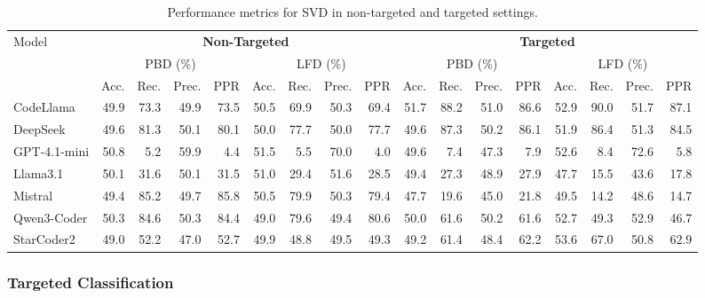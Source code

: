 \documentclass[lettersize,journal]{IEEEtran}
\begin{document}
\begin{table}[!t]
    \centering
    \caption{Performance metrics for \gls{SVD} in non-targeted and targeted settings.}
    \label{tab:metrics-svd}
    \scriptsize
    \renewcommand{\arraystretch}{1.0}
    \begin{tabular}{l rr rr rr rr rr rr rr rr}
    \toprule
    \multirow{3}{*}{Model}
      & \multicolumn{8}{c}{\textbf{Non-Targeted}}
      & \multicolumn{8}{c}{\textbf{Targeted}} \\
    \cmidrule(lr){2-9} \cmidrule(lr){10-17}
      & \multicolumn{4}{c}{PBD (\%)} & \multicolumn{4}{c}{LFD (\%)}
      & \multicolumn{4}{c}{PBD (\%)} & \multicolumn{4}{c}{LFD (\%)} \\
    \cmidrule(lr){2-5} \cmidrule(lr){6-9} \cmidrule(lr){10-13} \cmidrule(lr){14-17}
      & Acc. & Rec. & Prec. & PPR 
      & Acc. & Rec. & Prec. & PPR 
      & Acc. & Rec. & Prec. & PPR 
      & Acc. & Rec. & Prec. & PPR \\
    \midrule
    CodeLlama & 49.9 & 73.3 & 49.9 & 73.5 & 50.5 & 69.9	& 50.3 & 69.4 & 51.7 & 88.2 & 51.0 & 86.6 & 52.9 & 90.0 & 51.7 & 87.1 \\
    DeepSeek & 49.6 & 81.3 & 50.1 & 80.1 & 50.0 & 77.7 & 50.0 & 77.7 & 49.6 & 87.3 & 50.2 & 86.1 & 51.9 & 86.4 & 51.3 & 84.5 \\
    GPT-4.1-mini & 50.8 & 5.2 & 59.9 & 4.4 & 51.5 & 5.5 & 70.0 & 4.0 & 49.6 & 7.4 & 47.3 & 7.9 & 52.6 & 8.4 & 72.6 & 5.8 \\
    Llama3.1 & 50.1 & 31.6 & 50.1 & 31.5 & 51.0 & 29.4 & 51.6 & 28.5 & 49.4 & 27.3 & 48.9 & 27.9 & 47.7 & 15.5 & 43.6 & 17.8 \\
    Mistral & 49.4 & 85.2 & 49.7 & 85.8 & 50.5 & 79.9 & 50.3 & 79.4 & 47.7 & 19.6 & 45.0 & 21.8 & 49.5 & 14.2 & 48.6 & 14.7 \\
    Qwen3-Coder & 50.3 & 84.6 & 50.3 & 84.4 & 49.0 & 79.6 & 49.4 & 80.6 & 50.0& 61.6 & 50.2 & 61.6 & 52.7 & 49.3 & 52.9 & 46.7 \\
    StarCoder2 & 49.0 & 52.2 & 47.0 & 52.7 & 49.9 & 48.8 & 49.5 & 49.3 & 49.2& 61.4 & 48.4 & 62.2 & 53.6 & 67.0 & 50.8 & 62.9 \\
    \bottomrule
    \end{tabular}
\end{table}


\subsubsection{Targeted Classification}
\label{section:rq1-targeted}
\end{document}
